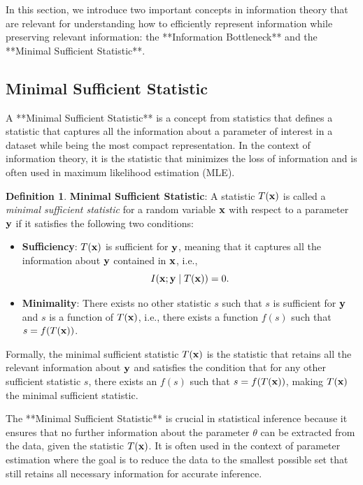 \documentclass[11pt, oneside]{book}
\theoremstyle{plain}
\theoremstyle{definition}
\newtheorem{definition}[theorem]{Definition}
\theoremstyle{remark}
\begin{document}
In this section, we introduce two important concepts in information theory that are relevant for understanding how to efficiently represent information while preserving relevant information: the **Information Bottleneck** and the **Minimal Sufficient Statistic**.


\subsection{Minimal Sufficient Statistic}

A **Minimal Sufficient Statistic** is a concept from statistics that defines a statistic that captures all the information about a parameter of interest in a dataset while being the most compact representation. In the context of information theory, it is the statistic that minimizes the loss of information and is often used in maximum likelihood estimation (MLE).

\begin{definition}
\textbf{Minimal Sufficient Statistic}: A statistic \( T({\mathbf{x}}) \) is called a \textit{minimal sufficient statistic} for a random variable \( {\mathbf{x}} \) with respect to a parameter \( {\mathbf{y}} \) if it satisfies the following two conditions:
\begin{itemize}
    \item \textbf{Sufficiency}: \( T({\mathbf{x}}) \) is sufficient for \( {\mathbf{y}} \), meaning that it captures all the information about \( {\mathbf{y}} \) contained in \( {\mathbf{x}} \), i.e., 
    \[
    I({\mathbf{x}}; {\mathbf{y}} \mid T({\mathbf{x}})) = 0.
    \]
    \item \textbf{Minimality}: There exists no other statistic \( s \) such that \( s \) is sufficient for \( {\mathbf{y}} \) and \( s \) is a function of \( T({\mathbf{x}}) \), i.e., there exists a function \( f(s) \) such that \( s = f(T({\mathbf{x}})) \).
\end{itemize}
Formally, the minimal sufficient statistic \( T({\mathbf{x}}) \) is the statistic that retains all the relevant information about \( {\mathbf{y}} \) and satisfies the condition that for any other sufficient statistic \( s \), there exists an \( f(s) \) such that \( s = f(T({\mathbf{x}})) \), making \( T({\mathbf{x}}) \) the minimal sufficient statistic.
\label{def:mss}
\end{definition}

The **Minimal Sufficient Statistic** is crucial in statistical inference because it ensures that no further information about the parameter $\theta$ can be extracted from the data, given the statistic $T({\mathbf{x}})$. It is often used in the context of parameter estimation where the goal is to reduce the data to the smallest possible set that still retains all necessary information for accurate inference.
\end{document}
